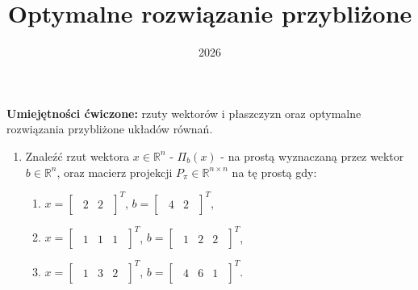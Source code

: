 \documentclass{article}
\title{Optymalne rozwiązanie przybliżone}
\date{2026}
\begin{document}
\maketitle

\begin{center}
\textbf{Umiejętności ćwiczone:} rzuty wektorów i płaszczyzn oraz optymalne rozwiązania przybliżone układów równań.
\end{center}



\begin{enumerate}
    \item Znaleźć rzut wektora $x \in \mathbb{R}^{n}$ - $\Pi_{b}(x)$ - na prostą wyznaczaną przez wektor $b\in \mathbb{R}^{n}$, oraz macierz projekcji $P_{\pi} \in \mathbb{R}^{n \times n}$ na tę prostą gdy:
        \begin{enumerate}
            \item $x = \begin{bmatrix}\begin{array}{rr} 2 & 2 \end{array}\end{bmatrix}^{T}$, $b = \begin{bmatrix}\begin{array}{rr} 4 & 2 \end{array}\end{bmatrix}^{T}$,
            \item $x = \begin{bmatrix}\begin{array}{rrr} 1 & 1 & 1 \end{array}\end{bmatrix}^{T}$, $b = \begin{bmatrix}\begin{array}{rrr} 1 & 2 & 2 \end{array}\end{bmatrix}^{T}$,
            \item $x = \begin{bmatrix}\begin{array}{rrr} 1 & 3 & 2 \end{array}\end{bmatrix}^{T}$, $b = \begin{bmatrix}\begin{array}{rrr} 4 & 6 & 1 \end{array}\end{bmatrix}^{T}$.
        \end{enumerate}


\end{enumerate}
\end{document}
